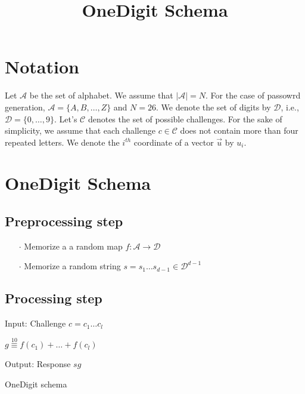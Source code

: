 \documentclass{article}
\title{\LARGE OneDigit Schema}
\author{}
\newenvironment{alg}{
    \begin{list}{}{
        \setlength{\itemsep}{2pt}
        \setlength{\parsep}{0pt}
        \setlength{\parskip}{0pt}
        \setlength{\topsep}{1pt}
    }
}
{
    \end{list}
}
\begin{document}
\maketitle

\section{Notation}
Let $\mathcal{A}$ be the set of alphabet. We assume that $|\mathcal{A}|=N$. For the case of passowrd generation, $\mathcal{A}=\{A,B,\ldots,Z\}$ and $N=26$. We denote the set of digits by $\mathcal{D}$, i.e., $\mathcal{D}=\{0,\ldots,9\}$. Let's $\mathcal{C}$ denotes the set of possible challenges. For the sake of simplicity, we assume that each challenge $c\in\mathcal{C}$ does not contain more than four repeated letters. We denote the $i^{th}$ coordinate of a vector $\vec{u}$ by $u_i$.

\section{OneDigit Schema}

\subsection{Preprocessing step}
\begin{itemize}
	\item[$\cdot$] Memorize a a random map $f:\mathcal{A} \to \mathcal{D}$
	\item[$\cdot$] Memorize a random string $s = s_1 \ldots s_{d-1}\in \mathcal{D}^{d-1}$
\end{itemize}

\subsection{Processing step}

\begin{algorithm}
\label{OneDigit}
\begin{alg}
\item[] Input: Challenge $c=c_1 \ldots c_l$
\item[] $g \overset{10}{\equiv} f(c_1)+\ldots +f(c_l)$
\item[] Output: Response $sg$
\label{alg:NotKnown}
\end{alg}
\caption{OneDigit schema}
\end{algorithm}
\end{document}
